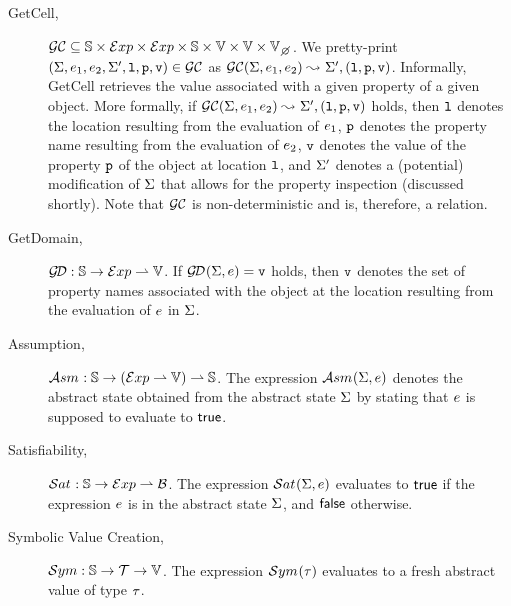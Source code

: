 \begin{description}
  
  \item[GetCell,] $\getcell \subseteq \absstates \times \exprs \times \exprs \times \absstates \times \absvals \times \absvals \times \setext{\absvals}{\none}$. 
          We pretty-print $(\Sigma, e_1, e_2, \Sigma', \mathtt{l}, \mathtt{p}, \mathtt{v}) \in \mathcal{GC}$ as $\mathcal{GC}(\Sigma, e_1, e_2) \leadsto_{} \Sigma', (\mathtt{l}, \mathtt{p}, \mathtt{v})$. 
          Informally, GetCell retrieves the value associated with a given property of a given object. More formally, if $\mathcal{GC}(\Sigma, e_1, e_2) \leadsto_{} \Sigma', (\mathtt{l}, \mathtt{p}, \mathtt{v})$ holds, 
          then  $\mathtt{l}$ denotes the location resulting from the evaluation of $e_1$, 
           $\mathtt{p}$ denotes the property name resulting from the evaluation of $e_2$, 
           $\mathtt{v}$ denotes the value of the property $\mathtt{p}$ of the object at location $\mathtt{l}$, 
          and  $\Sigma'$ denotes a (potential) modification of $\Sigma$ that allows for the property inspection (discussed shortly). 
          Note that $\mathcal{GC}$ is non-deterministic and is, therefore, a relation.
             
  \item[GetDomain,] $\mathcal{G\!D} : \mathbb{S} \rightarrow \mathcal{E}xp \rightharpoonup \mathbb{V}$. 
           If $\mathcal{G\!D}_{}(\Sigma, e) = \mathtt{v}$ holds, then $\mathtt{v}$ denotes the 
           set of property names associated with the object at the location resulting from the evaluation of $e$ 
           in $\Sigma$. 
   
   \item[Assumption,] $\mathcal{A}{sm}_{} : \mathbb{S} \rightarrow (\mathcal{E}xp \rightharpoonup \mathbb{V}) \rightharpoonup \mathbb{S}$. 
            The expression $\mathcal{A}{sm}_{}(\Sigma, e)$ denotes the abstract state obtained from the 
            abstract state $\Sigma$ by stating that $e$ is supposed to evaluate to ${\sf true}$. 
  
   \item[Satisfiability,] $\mathcal{S}at_{} : \mathbb{S} \rightarrow \mathcal{E}xp \rightharpoonup \mathcal{B}$. 
            The expression $\mathcal{S}at_{}(\Sigma, e)$ evaluates to ${\sf true}$ if the \jsil expression $e$ is  in the abstract 
            state $\Sigma$, and ${\sf false}$ otherwise.
             
   \item[Symbolic Value Creation,] $\mathcal{S}ym : \mathbb{S} \rightarrow \mathcal{T} \rightarrow \mathbb{V}$. 
            The expression $\mathcal{S}ym_{}(\tau)$ evaluates to a fresh abstract value of type $\tau$.
\end{description}


